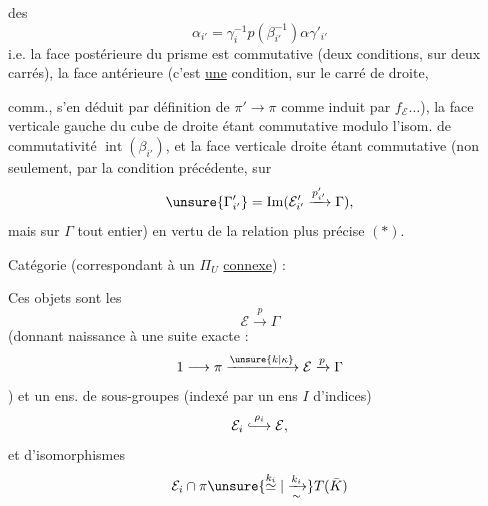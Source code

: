 

 des
\[
\alpha_{i'}=\gamma_i^{-1}p(\beta_{i'}^{-1})\alpha\gamma'_{i'}
\]
i.e. la face  postérieure du prisme est commutative (deux conditions, sur deux carrés), la face  antérieure  (c'est \uline{une} condition, sur le carré de droite, 


comm., s'en déduit par définition de $\pi'\longrightarrow\pi$ comme induit par $f_{\mathcal E}\ldots$), la face verticale gauche du cube de droite étant commutative modulo l'isom. de commutativité $\operatorname{int}(\beta_{i'})$, et la face verticale droite étant commutative (non seulement, par la condition précédente, sur
\[
\unsure{\Gamma'_{i'}}=\operatorname{Im}(\mathcal E'_{i'}\xrightarrow{p'_{i'}}\Gamma),
\]
mais sur $\Gamma$ tout entier) en vertu de la relation plus précise $(*)$.


Catégorie   (correspondant à un $\Pi_U$ \uline{connexe}) :

Ces objets sont les  
\[
\mathcal E\xrightarrow{p}\Gamma
\]
(donnant naissance à une suite exacte :
\[
1\longrightarrow\pi\xrightarrow{\unsure{k|\kappa}}\mathcal E\xrightarrow{p}\Gamma
\]
)
et un ens.  de sous-groupes (indexé par un ens $I$ d'indices)
\[
\mathcal E_i\overset{\rho_i}{\lhook\joinrel\longrightarrow}\mathcal E,
\]
et d'isomorphismes
\[
\mathcal E_i\cap\pi\unsure{\overset{k_i}{\simeq}|\xrightarrow[\sim]{k_i}}T(\bar K)
\]

